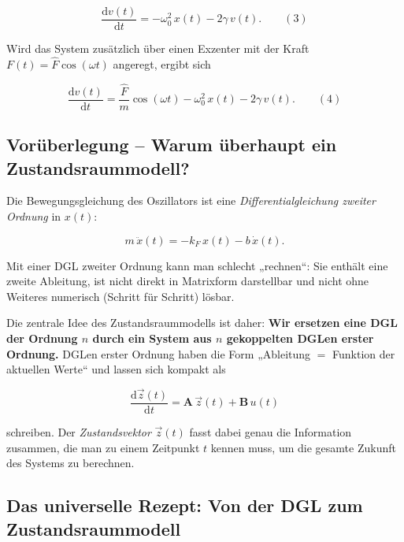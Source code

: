 $$
\frac{\mathrm{d}v(t)}{\mathrm{d}t} = -\omega_0^2\, x(t) - 2\gamma\, v(t).
\qquad (3)
$$

Wird das System zusätzlich über einen Exzenter mit der Kraft
$F(t) = \hat{F}\cos(\omega t)$ angeregt, ergibt sich

$$
\frac{\mathrm{d}v(t)}{\mathrm{d}t} = \frac{\hat{F}}{m}\cos(\omega t)
- \omega_0^2\, x(t) - 2\gamma\, v(t).
\qquad (4)
$$

\subsection*{Vorüberlegung – Warum überhaupt ein Zustandsraummodell?}

\begin{gedankenexperiment}

Die Bewegungsgleichung des Oszillators ist eine \emph{Differentialgleichung
zweiter Ordnung} in $x(t)$:

$$
m\,\ddot{x}(t) = -k_F\, x(t) - b\,\dot{x}(t).
$$

Mit einer DGL zweiter Ordnung kann man schlecht „rechnen``: Sie enthält eine
zweite Ableitung, ist nicht direkt in Matrixform darstellbar und nicht ohne
Weiteres numerisch (Schritt für Schritt) lösbar.

Die zentrale Idee des Zustandsraummodells ist daher: \textbf{Wir ersetzen eine
DGL der Ordnung $n$ durch ein System aus $n$ gekoppelten DGLen erster Ordnung.}
DGLen erster Ordnung haben die Form „Ableitung $=$ Funktion der aktuellen
Werte`` und lassen sich kompakt als

$$
\frac{\mathrm{d}\vec{z}(t)}{\mathrm{d}t} = \mathbf{A}\,\vec{z}(t) + \mathbf{B}\,u(t)
$$

schreiben. Der \emph{Zustandsvektor} $\vec{z}(t)$ fasst dabei genau die
Information zusammen, die man zu einem Zeitpunkt $t$ kennen muss, um die gesamte
Zukunft des Systems zu berechnen.

\end{gedankenexperiment}

\subsection*{Das universelle Rezept: Von der DGL zum Zustandsraummodell}

